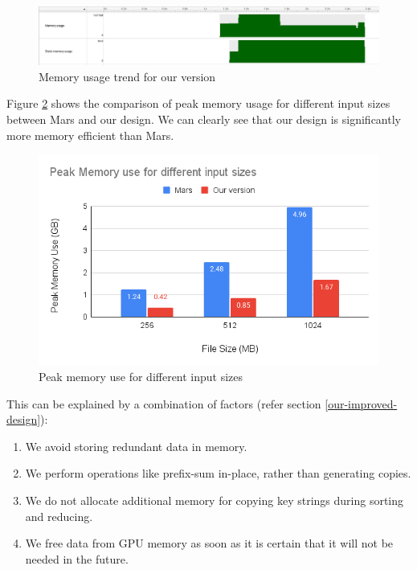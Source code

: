 \documentclass{article}
\begin{document}
\begin{figure}
    \centering
    \includegraphics[width=1\linewidth]{images/mr-our-memory.png}
    \caption{Memory usage trend for our version}
    \label{fig:mr-our-memory}
\end{figure}

Figure \ref{fig:mr-peak-memory} shows the comparison of peak memory usage for different input sizes between Mars and our design. We can clearly see that our design is significantly more memory efficient than Mars.

\begin{figure}
    \centering
    \includegraphics[width=1\linewidth]{images/mr-peak-memory.png}
    \caption{Peak memory use for different input sizes}
    \label{fig:mr-peak-memory}
\end{figure}

This can be explained by a combination of factors (refer section \ref{our-improved-design}):
\begin{enumerate}
    \item We avoid storing redundant data in memory.
    \item We perform operations like prefix-sum in-place, rather than generating copies.
    \item We do not allocate additional memory for copying key strings during sorting and reducing.
    \item We free data from GPU memory as soon as it is certain that it will not be needed in the future.
\end{enumerate}
\end{document}
